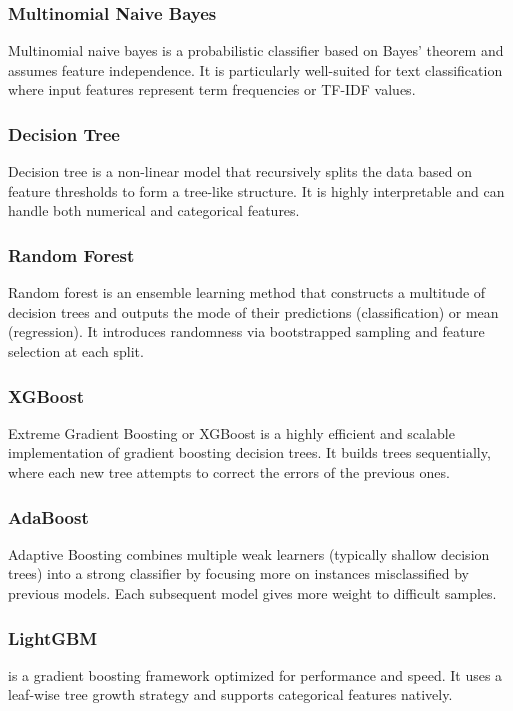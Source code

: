 \subsubsection{Multinomial Naive Bayes}  Multinomial naive bayes is a probabilistic classifier based on Bayes' theorem and assumes feature independence. It is particularly well-suited for text classification where input features represent term frequencies or TF-IDF values.

\subsubsection{Decision Tree} Decision tree is a non-linear model that recursively splits the data based on feature thresholds to form a tree-like structure. It is highly interpretable and can handle both numerical and categorical features.

\subsubsection{Random Forest} Random forest is an ensemble learning method that constructs a multitude of decision trees and outputs the mode of their predictions (classification) or mean (regression). It introduces randomness via bootstrapped sampling and feature selection at each split.

\subsubsection{XGBoost} Extreme Gradient Boosting or XGBoost is a highly efficient and scalable implementation of gradient boosting decision trees. It builds trees sequentially, where each new tree attempts to correct the errors of the previous ones.

\subsubsection{AdaBoost} Adaptive Boosting combines multiple weak learners (typically shallow decision trees) into a strong classifier by focusing more on instances misclassified by previous models. Each subsequent model gives more weight to difficult samples.
    
\subsubsection{LightGBM} is a gradient boosting framework optimized for performance and speed. It uses a leaf-wise tree growth strategy and supports categorical features natively.

